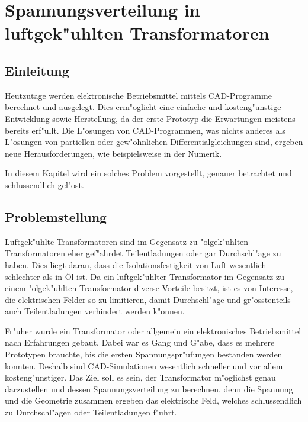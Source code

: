 \chapter{Spannungsverteilung in luftgek"uhlten Transformatoren\label{chapter:thema}}
\begin{refsection}

\section{Einleitung}

Heutzutage werden elektronische Betriebsmittel mittels CAD-Programme berechnet und ausgelegt. Dies erm"oglicht eine einfache und kosteng"unstige Entwicklung sowie Herstellung, da der erste Prototyp die Erwartungen meistens bereits erf"ullt. Die L"osungen von CAD-Programmen, was nichts anderes als L"osungen von partiellen oder gew"ohnlichen Differentialgleichungen sind, ergeben neue Herausforderungen, wie beispielsweise in der Numerik. 

In diesem Kapitel wird ein solches Problem vorgestellt, genauer betrachtet und schlussendlich gel"ost.

\section{Problemstellung}

Luftgek"uhlte Transformatoren sind im Gegensatz zu "olgek"uhlten Transformatoren eher gef"ahrdet Teilentladungen oder gar Durchschl"age zu haben. Dies liegt daran, dass die Isolationsfestigkeit von Luft wesentlich schlechter als in Öl ist. Da ein luftgek"uhlter Transformator im Gegensatz zu einem "olgek"uhlten Transformator diverse Vorteile besitzt, ist es von Interesse, die elektrischen Felder so zu limitieren, damit Durchschl"age und gr"osstenteils auch Teilentladungen verhindert werden k"onnen. 

Fr"uher wurde ein Transformator oder allgemein ein elektronisches Betriebsmittel nach Erfahrungen gebaut. Dabei war es Gang und G"abe, dass es mehrere Prototypen brauchte, bis die ersten Spannungspr"ufungen bestanden werden konnten. Deshalb sind CAD-Simulationen wesentlich schneller und vor allem kosteng"unstiger. Das Ziel soll es sein, der Transformator m"oglichst genau darzustellen und dessen Spannungsverteilung zu berechnen, denn die Spannung und die Geometrie zusammen ergeben das elektrische Feld, welches schlussendlich zu Durchschl"agen oder Teilentladungen f"uhrt.


\end{refsection}
